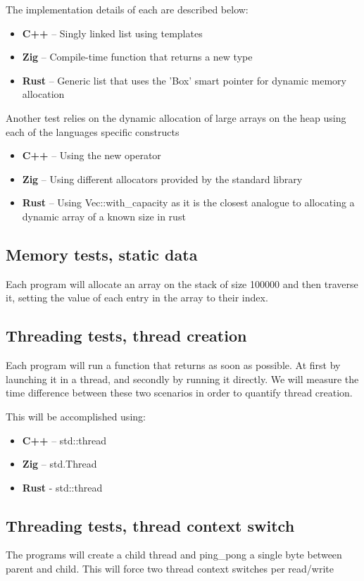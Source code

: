 \documentclass{article}
\begin{document}
The implementation details of each are described below:
\begin{itemize}
    \item \textbf{C++} – Singly linked list using templates
    \item \textbf{Zig} – Compile-time function that returns a new type
    \item \textbf{Rust} – Generic list that uses the 'Box' smart pointer for dynamic memory allocation
\end{itemize}

Another test relies on the dynamic allocation of large arrays on the heap using each of the languages specific constructs
\begin{itemize}
    \item \textbf{C++} – Using the new operator
    \item \textbf{Zig} – Using different allocators provided by the standard library
    \item \textbf{Rust} – Using Vec::with\_capacity as it is the closest analogue to allocating a dynamic array of a known size in rust
\end{itemize}

\subsection{Memory tests, static data}

Each program will allocate an array on the stack of size 100000 and then traverse it, setting the value of each entry in the array to their index.

\subsection{Threading tests, thread creation}

Each program will run a function that returns as soon as possible. At first by launching it in a thread, and secondly by running it directly.
We will measure the time difference between these two scenarios in order to quantify thread creation.

This will be accomplished using:
\begin{itemize}
    \item \textbf{C++} – std::thread
    \item \textbf{Zig} – std.Thread
    \item \textbf{Rust} - std::thread
\end{itemize}

\subsection{Threading tests, thread context switch}
The programs will create a child thread and ping\_pong a single byte between parent and child. This will force two thread context switches per read/write
\end{document}
